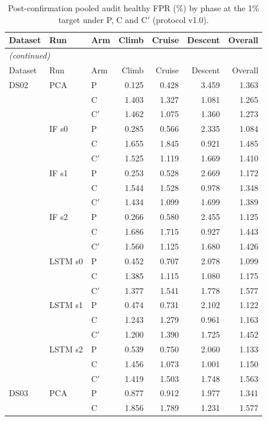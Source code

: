 \begin{footnotesize}
\begin{longtable}{lllrrrr}
\caption{Post-confirmation pooled audit healthy FPR (\%) by phase at the 1\% target under P, C and C$'$ (protocol v1.0).}\label{tab:s8_phase_fpr}\\
\toprule
Dataset & Run & Arm & Climb & Cruise & Descent & Overall \\
\midrule
\endfirsthead
\multicolumn{7}{l}{\emph{(continued)}}\\
\toprule
Dataset & Run & Arm & Climb & Cruise & Descent & Overall \\
\midrule
\endhead
\bottomrule
\endfoot
DS02 & PCA & P & 0.125 & 0.428 & 3.459 & 1.363 \\
 &  & C & 1.403 & 1.327 & 1.081 & 1.265 \\
 &  & C$'$ & 1.462 & 1.075 & 1.360 & 1.273 \\
 & IF s0 & P & 0.285 & 0.566 & 2.335 & 1.084 \\
 &  & C & 1.655 & 1.845 & 0.921 & 1.485 \\
 &  & C$'$ & 1.525 & 1.119 & 1.669 & 1.410 \\
 & IF s1 & P & 0.253 & 0.528 & 2.669 & 1.172 \\
 &  & C & 1.544 & 1.528 & 0.978 & 1.348 \\
 &  & C$'$ & 1.434 & 1.099 & 1.699 & 1.389 \\
 & IF s2 & P & 0.266 & 0.580 & 2.455 & 1.125 \\
 &  & C & 1.686 & 1.715 & 0.927 & 1.443 \\
 &  & C$'$ & 1.560 & 1.125 & 1.680 & 1.426 \\
 & LSTM s0 & P & 0.452 & 0.707 & 2.078 & 1.099 \\
 &  & C & 1.385 & 1.115 & 1.080 & 1.175 \\
 &  & C$'$ & 1.377 & 1.541 & 1.778 & 1.577 \\
 & LSTM s1 & P & 0.474 & 0.731 & 2.102 & 1.122 \\
 &  & C & 1.243 & 1.279 & 0.961 & 1.163 \\
 &  & C$'$ & 1.200 & 1.390 & 1.725 & 1.452 \\
 & LSTM s2 & P & 0.539 & 0.750 & 2.060 & 1.133 \\
 &  & C & 1.456 & 1.073 & 1.001 & 1.150 \\
 &  & C$'$ & 1.419 & 1.503 & 1.748 & 1.563 \\
\midrule
DS03 & PCA & P & 0.877 & 0.912 & 1.977 & 1.341 \\
 &  & C & 1.856 & 1.789 & 1.231 & 1.577 \\

\end{longtable}
\end{footnotesize}
